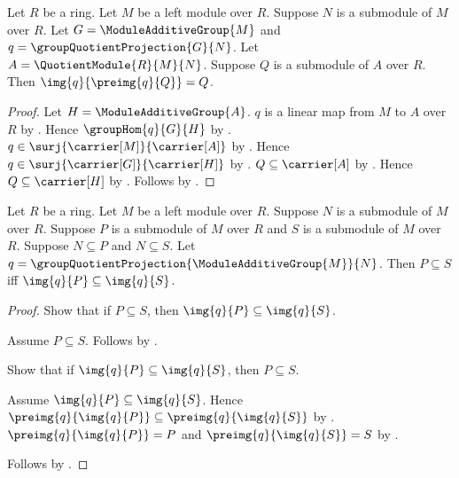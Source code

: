 \begin{theorem}\label{module_quotient_correspondence_image_preimage}
    Let $R$ be a ring.
    Let $M$ be a left module over $R$.
    Suppose $N$ is a submodule of $M$ over $R$.
    Let $G=\ModuleAdditiveGroup{M}$ and
        $q=\groupQuotientProjection{G}{N}$.
    Let $A=\QuotientModule{R}{M}{N}$.
    Suppose $Q$ is a submodule of $A$ over $R$.
    Then $\img{q}{\preimg{q}{Q}}=Q$.
\end{theorem}
\begin{proof}
    Let $H=\ModuleAdditiveGroup{A}$.
    $q$ is a linear map from $M$ to $A$ over $R$ by
        .
    Hence $\groupHom{q}{G}{H}$ by
        .
    $q\in\surj{\carrier[M]}{\carrier[A]}$ by
        .
    Hence $q\in\surj{\carrier[G]}{\carrier[H]}$ by
        .
    $Q\subseteq\carrier[A]$ by .
    Hence $Q\subseteq\carrier[H]$ by
        .
    Follows by .
\end{proof}

\begin{theorem}\label{module_quotient_correspondence_image_inclusion}
    Let $R$ be a ring.
    Let $M$ be a left module over $R$.
    Suppose $N$ is a submodule of $M$ over $R$.
    Suppose $P$ is a submodule of $M$ over $R$ and
        $S$ is a submodule of $M$ over $R$.
    Suppose $N\subseteq P$ and $N\subseteq S$.
    Let $q=\groupQuotientProjection{\ModuleAdditiveGroup{M}}{N}$.
    Then $P\subseteq S$ iff $\img{q}{P}\subseteq\img{q}{S}$.
\end{theorem}
\begin{proof}
    Show that if $P\subseteq S$, then
        $\img{q}{P}\subseteq\img{q}{S}$.
    \begin{subproof}
        Assume $P\subseteq S$.
        Follows by .
    \end{subproof}
    Show that if $\img{q}{P}\subseteq\img{q}{S}$, then
        $P\subseteq S$.
    \begin{subproof}
        Assume $\img{q}{P}\subseteq\img{q}{S}$.
        Hence
            $\preimg{q}{\img{q}{P}}
                \subseteq\preimg{q}{\img{q}{S}}$ by
            .
        $\preimg{q}{\img{q}{P}}=P$ and
            $\preimg{q}{\img{q}{S}}=S$ by
            .
    \end{subproof}
    Follows by \auto.
\end{proof}

